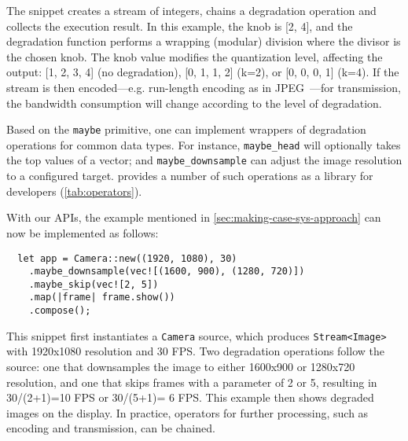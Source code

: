 The snippet creates a stream of integers, chains a degradation operation and
collects the execution result. In this example, the knob is [2, 4], and the
degradation function performs a wrapping (modular) division where the divisor is
the chosen knob. The knob value modifies the quantization level, affecting the
output: [1, 2, 3, 4] (no degradation), [0, 1, 1, 2] (k=2), or [0, 0, 0, 1]
(k=4). If the stream is then encoded---e.g. run-length encoding as in
JPEG~\cite{wallace1992jpeg}---for transmission, the bandwidth consumption will
change according to the level of degradation.

Based on the \texttt{maybe} primitive, one can implement wrappers of degradation
operations for common data types. For instance, \texttt{maybe\_head} will
optionally takes the top values of a vector; and
\texttt{maybe\_downsample} can adjust the image resolution to a
configured target. \sysname{} provides a number of such operations as a library for
developers (\autoref{tab:operators}).

With our APIs, the example mentioned in \autoref{sec:making-case-sys-approach}
can now be implemented as follows:

\vspace{-2pt}
\begin{lstlisting}
  let app = Camera::new((1920, 1080), 30)
    .maybe_downsample(vec![(1600, 900), (1280, 720)])
    .maybe_skip(vec![2, 5])
    .map(|frame| frame.show())
    .compose();
\end{lstlisting}

This snippet first instantiates a \texttt{Camera} source, which produces
\texttt{Stream<Image>} with 1920x1080 resolution and 30 FPS\@. Two degradation
operations follow the source: one that downsamples the image to either 1600x900 or
1280x720 resolution, and one that skips frames with a parameter of 2 or 5, resulting
in 30/(2+1)=10 FPS or 30/(5+1)= 6 FPS\@. This example then shows degraded images
on the display. In practice, operators for further processing, such as encoding and
transmission, can be chained.

